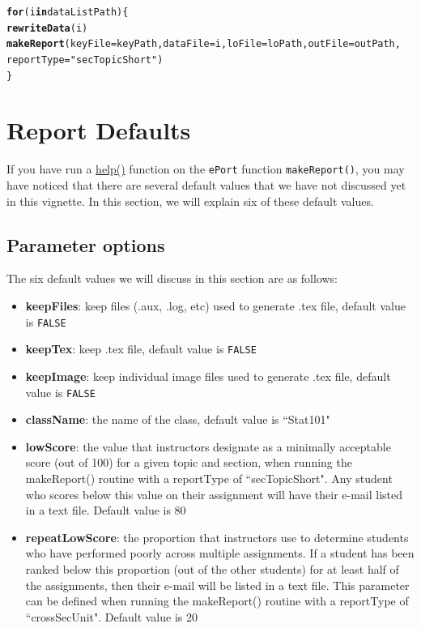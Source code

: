 \documentclass[11pt,a4paper,oldfontcommands,openany]{memoir}
\makeatletter
\newcommand{\hlstr}[1]{\textcolor[rgb]{0.192,0.494,0.8}{#1}}%
\newcommand{\hlstd}[1]{\textcolor[rgb]{0.345,0.345,0.345}{#1}}%
\newcommand{\hlkwa}[1]{\textcolor[rgb]{0.161,0.373,0.58}{\textbf{#1}}}%
\newcommand{\hlkwc}[1]{\textcolor[rgb]{0.333,0.667,0.333}{#1}}%
\newcommand{\hlkwd}[1]{\textcolor[rgb]{0.737,0.353,0.396}{\textbf{#1}}}%
\newenvironment{kframe}{%
 \def\at@end@of@kframe{}%
 \ifinner\ifhmode%
  \def\at@end@of@kframe{\end{minipage}}%
  \begin{minipage}{\columnwidth}%
 \fi\fi%
 \def\FrameCommand##1{\hskip\@totalleftmargin \hskip-\fboxsep
 \colorbox{shadecolor}{##1}\hskip-\fboxsep
     \hskip-\linewidth \hskip-\@totalleftmargin \hskip\columnwidth}%
 \MakeFramed {\advance\hsize-\width
   \@totalleftmargin\z@ \linewidth\hsize
   \@setminipage}}%
 {\par\unskip\endMakeFramed%
 \at@end@of@kframe}
\newenvironment{knitrout}{}{} %
\numberwithin{equation}{section} %
\makeatother
\begin{document}
\begin{knitrout}
\color{fgcolor}\begin{kframe}
\begin{alltt}
\hlkwa{for} \hlstd{(i} \hlkwa{in} \hlstd{dataListPath)\{}
  \hlkwd{rewriteData}\hlstd{(i)}
  \hlkwd{makeReport}\hlstd{(}\hlkwc{keyFile} \hlstd{= keyPath,} \hlkwc{dataFile} \hlstd{= i,} \hlkwc{loFile} \hlstd{= loPath,} \hlkwc{outFile} \hlstd{= outPath,}
    \hlkwc{reportType} \hlstd{=} \hlstr{"secTopicShort"}\hlstd{)}
\hlstd{\}}
\end{alltt}
\end{kframe}
\end{knitrout}

\chapter{Report Defaults}
\label{sec:repOptions}

If you have run a \hyperref[sec:helpSection]{help()} function on the \texttt{ePort} function \texttt{makeReport()}, you may have noticed that there are several default values that we have not discussed yet in this vignette. In this section, we will explain six of these default values.

\section{Parameter options}

The six default values we will discuss in this section are as follows:

\begin{itemize}
\item \textbf{keepFiles}: keep files (.aux, .log, etc) used to generate .tex file, default value is \texttt{FALSE}
\item \textbf{keepTex}: keep .tex file, default value is \texttt{FALSE}
\item \textbf{keepImage}: keep individual image files used to generate .tex file, default value is \texttt{FALSE}
\item \textbf{className}: the name of the class, default value is ``Stat101"
\item \textbf{lowScore}: the value that instructors designate as a minimally acceptable score (out of 100) for a given topic and section, when running the makeReport() routine with a reportType of ``secTopicShort". Any student who scores below this value on their assignment will have their e-mail listed in a text file. Default value is 80
\item \textbf{repeatLowScore}: the proportion that instructors use to determine students who have performed poorly across multiple assignments. If a student has been ranked below this proportion (out of the other students) for at least half of the assignments, then their e-mail will be listed in a text file. This parameter can be defined when running the makeReport() routine with a reportType of ``crossSecUnit". Default value is 20
\end{itemize}
\end{document}
